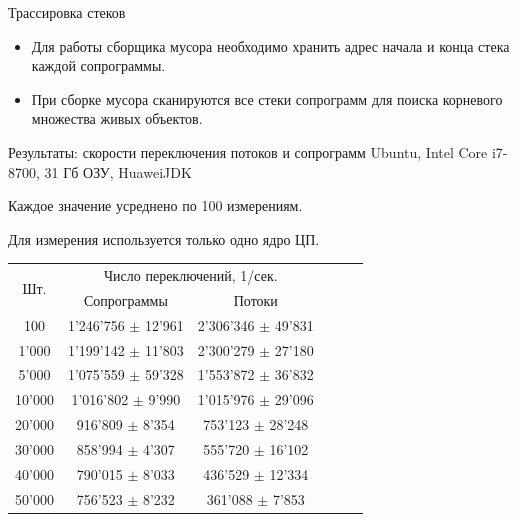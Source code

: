\begin{frame}{Трассировка стеков}

	\begin{itemize}
		\item Для работы сборщика мусора необходимо хранить адрес начала и конца стека каждой сопрограммы.
		\item При сборке мусора сканируются все стеки сопрограмм для поиска корневого множества живых объектов.
	\end{itemize}
\end{frame}	

\begin{frame}{Результаты: скорости переключения потоков и сопрограмм}
	Ubuntu, Intel Core i7-8700, 31 Гб ОЗУ, HuaweiJDK
	\par Каждое значение усреднено по 100 измерениям. 
	\par Для измерения используется только одно ядро ЦП.
	\begin{table}[H]
		\begin{tabular}{|c|c|c|c|c|c|}
			\hline \multirow{2}{*}{Шт.} & \multicolumn{2}{|c|}{Число переключений, 1/сек.}    \\
			\cline{2-3}    & Сопрограммы              & Потоки                    \\
			\hline 100     & 1'246'756 $\pm$ 12'961 & 2'306'346 $\pm$ 49'831  \\
			\hline 1'000   & 1'199'142 $\pm$ 11'803 & 2'300'279 $\pm$ 27'180  \\
			\hline 5'000   & 1'075'559 $\pm$ 59'328 & 1'553'872 $\pm$ 36'832  \\
			\hline 10'000  & 1'016'802 $\pm$ 9'990  & 1'015'976 $\pm$ 29'096  \\ 
			\hline 20'000  & 916'809 $\pm$ 8'354    & 753'123 $\pm$ 28'248    \\ 
			\hline 30'000  & 858'994 $\pm$ 4'307    & 555'720 $\pm$ 16'102    \\ 
			\hline 40'000  & 790'015 $\pm$ 8'033    & 436'529 $\pm$ 12'334    \\ 
			\hline 50'000  & 756'523 $\pm$ 8'232    & 361'088 $\pm$ 7'853     \\ 
			\hline 
		\end{tabular}
	\end{table}
	
\end{frame}


